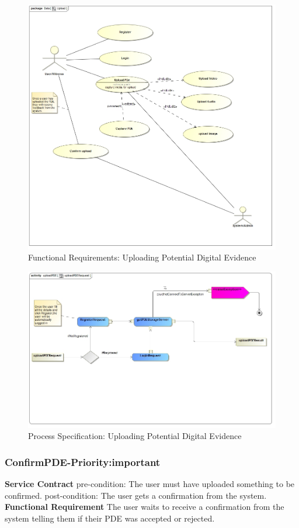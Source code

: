 \documentclass[a4paper,12pt]{article}
\begin{document}
\begin{figure}[H]	
\includegraphics[width=\textwidth]{images/upload.jpg}
\caption{Functional Requirements: Uploading Potential Digital Evidence \label{overflow}}
\end{figure}
\begin{figure}[H]
\includegraphics[width=\textwidth]{images/uploadPDERequest.jpg}
\caption{Process Specification: Uploading Potential Digital Evidence \label{overflow}}
\end{figure}
\subsubsection{ConfirmPDE-Priority:important}
\textbf{Service Contract}\newline
pre-condition: The user must have uploaded something to be confirmed.\newline
post-condition: The user gets a confirmation from the system.\newline
\textbf{Functional Requirement}\newline
The user waits to receive a confirmation from the system telling them if their PDE was accepted or rejected.\newpage
\end{document}
